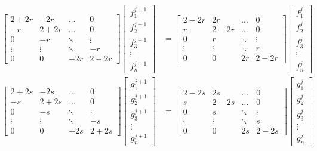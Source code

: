 \begin{align}
\begin{bmatrix}
    2+2r   & -2r    & \dots  & 0 \\
    -r     & 2+2r   & \dots  & 0 \\
    0      & -r     & \ddots & \vdots \\
    \vdots & \vdots & \ddots & -r   \\
    0      & 0      & -2r    & 2+2r
\end{bmatrix}
\begin{bmatrix}
    f_1^{j+1} \\
    f_2^{j+1} \\
    f_3^{j+1} \\
    \vdots    \\
    f_n^{j+1}
\end{bmatrix}
&=
\begin{bmatrix}
    2-2r   & 2r     & \dots  & 0 \\
    r      & 2-2r   & \dots  & 0 \\
    0      & r      & \ddots & \vdots \\
    \vdots & \vdots & \ddots & r   \\
    0      & 0      & 2r     & 2-2r
\end{bmatrix}
\begin{bmatrix}
    f_1^{j} \\
    f_2^{j} \\
    f_3^{j} \\
    \vdots    \\
    f_n^{j}
\end{bmatrix} \\[10pt]
\begin{bmatrix}
    2+2s   & -2s    & \dots  & 0 \\
    -s     & 2+2s   & \dots  & 0 \\
    0      & -s     & \ddots & \vdots \\
    \vdots & \vdots & \ddots & -s   \\
    0      & 0      & -2s    & 2+2s
\end{bmatrix}
\begin{bmatrix}
    g_1^{j+1} \\
    g_2^{j+1} \\
    g_3^{j+1} \\
    \vdots    \\
    g_n^{j+1}
\end{bmatrix}
&=
\begin{bmatrix}
    2-2s   & 2s     & \dots  & 0 \\
    s      & 2-2s   & \dots  & 0 \\
    0      & s      & \ddots & \vdots \\
    \vdots & \vdots & \ddots & s   \\
    0      & 0      & 2s     & 2-2s
\end{bmatrix}
\begin{bmatrix}
    g_1^{j} \\
    g_2^{j} \\
    g_3^{j} \\
    \vdots    \\
    g_n^{j}
\end{bmatrix}
\end{align}
